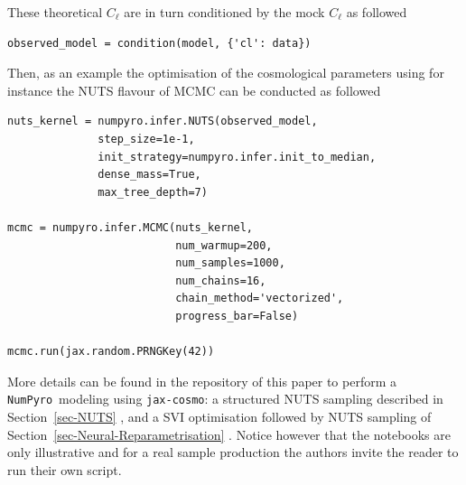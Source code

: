 \documentclass[twocolumn,twocolappendix,nofootinbib,iop]{openjournal}
\newcommand{\nblink}[1]{\href{https://github.com/DifferentiableUniverseInitiative/jax-cosmo-paper/blob/master/notebooks/#1.ipynb}{\faFileCodeO}}
\newcommand{\numpyro}{\texttt{NumPyro}}
\newcommand{\jaxcosmo}{\texttt{jax-cosmo}}
\begin{document}
These theoretical $C_{\ell}$ are in turn conditioned by the mock $C_\ell$ as followed
\begin{lstlisting}[language=iPython]
observed_model = condition(model, {'cl': data})
\end{lstlisting}
Then, as an example the optimisation of the cosmological parameters using for instance the NUTS flavour of MCMC can be conducted as followed
\begin{lstlisting}[language=iPython]
nuts_kernel = numpyro.infer.NUTS(observed_model,
              step_size=1e-1, 
              init_strategy=numpyro.infer.init_to_median,
              dense_mass=True,
              max_tree_depth=7)

mcmc = numpyro.infer.MCMC(nuts_kernel, 
                          num_warmup=200, 
                          num_samples=1000,
                          num_chains=16,
                          chain_method='vectorized',
                          progress_bar=False)

mcmc.run(jax.random.PRNGKey(42))
\end{lstlisting}
More details can be found in the repository of this paper to perform a \numpyro\ modeling using \jaxcosmo : a structured NUTS sampling described in Section~\ref{sec-NUTS} \nblink{VectorizedNumPyro_block}, and a SVI optimisation followed by NUTS sampling of Section~\ref{sec-Neural-Reparametrisation} \nblink{DESY_Y1_shear_cluster_ModelReparam_SVI-MVN_Neutra_NUTS}. Notice however that the notebooks are only illustrative and for a real sample production the authors invite the reader to run their own script.
\end{document}
